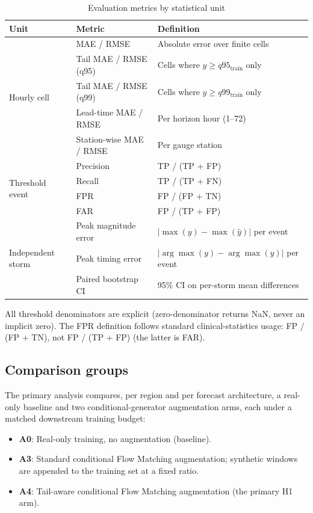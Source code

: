 \begin{table}[htbp]
\centering
\caption{Evaluation metrics by statistical unit}
\small
\begin{tabular}{lll}
\toprule
Unit & Metric & Definition \\
\midrule
\multirow{5}{*}{Hourly cell}
    & MAE / RMSE & Absolute error over finite cells \\
    & Tail MAE / RMSE (q95) & Cells where $y \geq q95_{\text{train}}$ only \\
    & Tail MAE / RMSE (q99) & Cells where $y \geq q99_{\text{train}}$ only \\
    & Lead-time MAE / RMSE & Per horizon hour (1--72) \\
    & Station-wise MAE / RMSE & Per gauge station \\
\midrule
\multirow{4}{*}{Threshold event}
    & Precision & TP / (TP + FP) \\
    & Recall & TP / (TP + FN) \\
    & FPR & FP / (FP + TN)  \\
    & FAR & FP / (TP + FP) \\
\midrule
\multirow{3}{*}{Independent storm}
    & Peak magnitude error & $|\max(y) - \max(\hat{y})|$ per event \\
    & Peak timing error & $|\arg\max(y) - \arg\max(\hat{y})|$ per event \\
    & Paired bootstrap CI & 95\% CI on per-storm mean differences \\
\bottomrule
\end{tabular}
\label{tab:metrics}
\end{table}

All threshold denominators are explicit (zero-denominator returns NaN, never an
implicit zero). The FPR definition follows standard clinical-statistics usage:
FP / (FP + TN), not FP / (TP + FP) (the latter is FAR).

\subsection{Comparison groups}
The primary analysis compares, per region and per forecast architecture, a
real-only baseline and two conditional-generator augmentation arms, each
under a matched downstream training budget:

\begin{itemize}
    \item \textbf{A0}: Real-only training, no augmentation (baseline).
    \item \textbf{A3}: Standard conditional Flow Matching augmentation;
    synthetic windows are appended to the training set at a fixed ratio.
    \item \textbf{A4}: Tail-aware conditional Flow Matching augmentation
    (the primary H1 arm).
\end{itemize}

